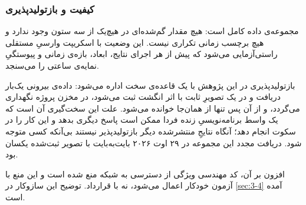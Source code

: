 \subsubsection*{کیفیت و بازتولیدپذیری}

مجموعه‌ی داده کامل است: هیچ مقدار گم‌شده‌ای در هیچ‌یک از سه ستون وجود ندارد و هیچ
برچسب زمانی تکراری نیست. این وضعیت با اسکریپت وارسیِ مستقلی راستی‌آزمایی می‌شود که
پیش از هر اجرای نتایج، ابعاد، بازه‌ی زمانی و پیوستگیِ نمایه‌ی ساعتی را می‌سنجد.

بازتولیدپذیری در این پژوهش با یک قاعده‌ی سخت اداره می‌شود: داده‌ی بیرونی یک‌بار
دریافت و در یک تصویرِ ثابت با اثر انگشت  ثبت می‌شود، در مخزن پروژه
نگهداری می‌گردد، و از آن پس تنها از همان‌جا خوانده می‌شود. علت این سخت‌گیری آن است
که یک واسط برنامه‌نویسیِ زنده فردا ممکن است پاسخ دیگری بدهد و این کار را در سکوت
انجام دهد؛ آنگاه نتایجِ منتشرشده دیگر بازتولیدپذیر نیستند بی‌آنکه کسی متوجه شود.
دریافت مجدد این مجموعه در ۲۹ اوت ۲۰۲۶ بایت‌به‌بایت با تصویر ثبت‌شده یکسان بود.

افزون بر آن، کد مهندسی ویژگی از دسترسی به شبکه منع شده است و این منع با آزمون خودکار
اعمال می‌شود، نه با قرارداد. توضیح این سازوکار در \cref{sec:3-4} آمده است.
